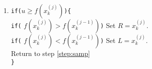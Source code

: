 \documentclass{article}
\begin{document}
\begin{enumerate}
\begin{enumerate}[label=\alph*.,leftmargin=1.75\parindent]
\begin{enumerate}
      \item {\tt if(}$u \ge f(x^{(j)}_k)${\tt)\{} \\
       {\tt if(} $f(x^{(j)}_k) > f(x^{(j-1)}_k)${\tt)} Set $R = x^{(j)}_k$. \\
       {\tt if(} $f(x^{(j)}_k) < f(x^{(j-1)}_k)${\tt)} Set $L = x^{(j)}_k$. \\
       Return to step \ref{step:samp} \\
       {\tt \}}
      \end{enumerate}

\end{enumerate}
\end{enumerate}
\end{document}
